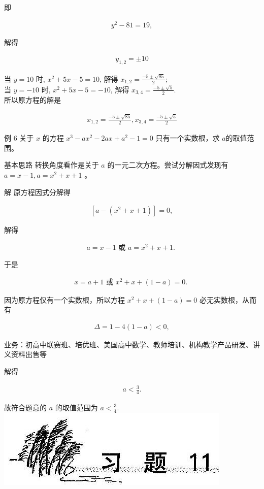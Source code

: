 \documentclass[10pt]{article}
\begin{document}
即

\begin{align*}
y^{2}-81=19,
\end{align*}

解得

\begin{align*}
y_{1,2}= \pm 10
\end{align*}

当 $y=10$ 时, $x^{2}+5 x-5=10$, 解得 $x_{1,2}=\frac{-5 \pm \sqrt{85}}{2}$;\\
当 $y=-10$ 时, $x^{2}+5 x-5=-10$, 解得 $x_{3,4}=\frac{-5 \pm \sqrt{5}}{2}$.\\
所以原方程的解是

\begin{align*}
x_{1,2}=\frac{-5 \pm \sqrt{85}}{2}, x_{3,4}=\frac{-5 \pm \sqrt{5}}{2}
\end{align*}

例 6 关于 $x$ 的方程 $x^{3}-a x^{2}-2 a x+a^{2}-1=0$ 只有一个实数根，求 $a$的取值范围。

基本思路 转换角度看作是关于 $a$ 的一元二次方程。尝试分解因式发现有 $a=x-1, a=x^{2}+x+1$ 。

解 原方程因式分解得

\begin{align*}
[a-(x-1)]\left[a-\left(x^{2}+x+1\right)\right]=0,
\end{align*}

解得

\begin{align*}
a=x-1 \text { 或 } a=x^{2}+x+1 \text {. }
\end{align*}

于是

\begin{align*}
x=a+1 \text { 或 } x^{2}+x+(1-a)=0 \text {. }
\end{align*}

因为原方程仅有一个实数根，所以方程 $x^{2}+x+(1-a)=0$ 必无实数根，从而有

\begin{align*}
\Delta=1-4(1-a)<0,
\end{align*}

业务：初高中联赛班、培优班、美国高中数学、教师培训、机构教学产品研发、讲义资料出售等

解得

\begin{align*}
a<\frac{3}{4} .
\end{align*}

故符合题意的 $a$ 的取值范围为 $a<\frac{3}{4}$.\\
\includegraphics[max width=\textwidth, center]{2024_10_30_26b590fd1106d28139f0g-073}
\end{document}
